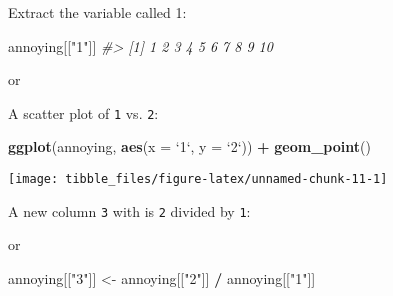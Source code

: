 \documentclass[]{book}
\newenvironment{Shaded}{\begin{snugshade}}{\end{snugshade}}
\newcommand{\CommentTok}[1]{\textcolor[rgb]{0.56,0.35,0.01}{\textit{#1}}}
\newcommand{\DataTypeTok}[1]{\textcolor[rgb]{0.13,0.29,0.53}{#1}}
\newcommand{\KeywordTok}[1]{\textcolor[rgb]{0.13,0.29,0.53}{\textbf{#1}}}
\newcommand{\NormalTok}[1]{#1}
\newcommand{\OperatorTok}[1]{\textcolor[rgb]{0.81,0.36,0.00}{\textbf{#1}}}
\newcommand{\StringTok}[1]{\textcolor[rgb]{0.31,0.60,0.02}{#1}}
\theoremstyle{definition}
\theoremstyle{definition}
\theoremstyle{definition}
\theoremstyle{remark}
\begin{document}
Extract the variable called 1:

\begin{Shaded}
\begin{Highlighting}[]
\NormalTok{annoying[[}\StringTok{"1"}\NormalTok{]]}
\CommentTok{#>  [1]  1  2  3  4  5  6  7  8  9 10}
\end{Highlighting}
\end{Shaded}

or

\begin{Shaded}
\end{Shaded}

A scatter plot of \texttt{1} vs. \texttt{2}:

\begin{Shaded}
\begin{Highlighting}[]
\KeywordTok{ggplot}\NormalTok{(annoying, }\KeywordTok{aes}\NormalTok{(}\DataTypeTok{x =} \StringTok{`}\DataTypeTok{1}\StringTok{`}\NormalTok{, }\DataTypeTok{y =} \StringTok{`}\DataTypeTok{2}\StringTok{`}\NormalTok{)) }\OperatorTok{+}
\StringTok{  }\KeywordTok{geom_point}\NormalTok{()}
\end{Highlighting}
\end{Shaded}

\begin{center}\texttt{[image: tibble\_files/figure-latex/unnamed-chunk-11-1]} \end{center}

A new column \texttt{3} with is \texttt{2} divided by \texttt{1}:

\begin{Shaded}
\end{Shaded}

or

\begin{Shaded}
\begin{Highlighting}[]
\NormalTok{annoying[[}\StringTok{"3"}\NormalTok{]] <-}\StringTok{ }\NormalTok{annoying[[}\StringTok{"2"}\NormalTok{]] }\OperatorTok{/}\StringTok{ }\NormalTok{annoying[[}\StringTok{"1"}\NormalTok{]]}
\end{Highlighting}
\end{Shaded}
\end{document}

